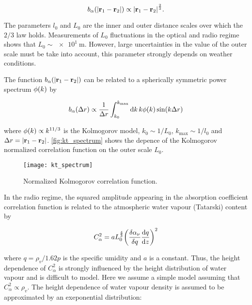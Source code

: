 \begin{equation}
        b_\alpha\qty(\abs{\vb{r}_1 - \vb{r}_2}) \propto
        \abs{\vb{r}_1 - \vb{r}_2}^\frac{2}{3}.
\end{equation}

The parameters $l_0$ and $L_0$ are the inner and outer distance scales over
which the $2/3$ law holds. Measurements of $L_0$ fluctuations in the
optical and radio regime shows that $L_0 \sim \SI{e1}{\meter}$. However, large
uncertainties in the value of the outer scale must be take into account,
this parameter strongly depends on weather conditions.

The function $b_\alpha\qty(\abs{\vb{r}_1 - \vb{r}_2})$ can be related to a
spherically symmetric power spectrum $\phi\qty(k)$ by

\begin{equation}
        b_\alpha\qty(\Delta r) \propto \frac{1}{\Delta r}
        \int^{k_\text{max}}_{k_0} \dd{k} k \phi\qty(k) \sin(k\Delta r)
\end{equation}

where $\phi\qty(k) \propto k^{11/3}$ is the Kolmogorov model, $k_0 \sim
1/L_0$, $k_\text{max} \sim 1/l_0$ and $\Delta r = \abs{\vb{r}_1 -
\vb{r}_2}$. \autoref{fig:kt_spectrum} shows the depence of the Kolmogorov
normalized correlation function on the outer scale $L_0$.

\begin{figure}
        \centering
        \texttt{[image: kt\_spectrum]}
        \caption{Normalized Kolmogorov correlation function.}
        \label{fig:kt_spectrum}
\end{figure}

In the radio regime, the squared amplitude appearing in the absorption
coefficient correlation function is related to the atmospheric water vapour
(Tatarski) content by

\begin{equation}
        C^2_\alpha = a L^\frac{4}{3}_0 \qty(\fdv{\alpha_\nu}{q}
        \dv{q}{z})^2
\end{equation}

where $q = \rho_v/1.62p$ is the specific umidity and $a$ is a constant.
Thus, the height dependence of $C^2_\alpha$ is strongly influenced by the
height distribution of water vapour and is difficult to model. Here we
assume a simple model assuming that $C^2_\alpha \propto \rho_v$. The height
dependence of water vapour density is assumed to be approximated by an
exeponential distribution:

